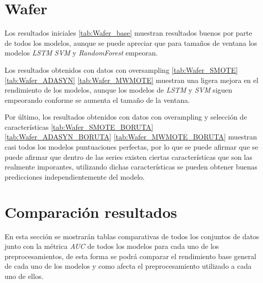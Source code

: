 \section{Wafer}

Los resultados iniciales \ref{tab:Wafer_base} muestran resultados buenos por parte de todos los modelos, aunque se puede apreciar que para tamaños de ventana los modelos \textit{LSTM} \textit{SVM} y \textit{RandomForest} empeoran.\newline

Los resultados obtenidos con datos con oversampling \ref{tab:Wafer_SMOTE} \ref{tab:Wafer_ADASYN} \ref{tab:Wafer_MWMOTE} muestran una ligera mejora en el rendimiento de los modelos, aunque los modelos de \textit{LSTM} y \textit{SVM} siguen empeorando conforme se aumenta el tamaño de la ventana.\newline

Por último, los resultados obtenidos con datos con overampling y selección de características \ref{tab:Wafer_SMOTE_BORUTA} \ref{tab:Wafer_ADASYN_BORUTA} \ref{tab:Wafer_MWMOTE_BORUTA} muestran casi todos los modelos puntuaciones perfectas, por lo que se puede afirmar que se puede afirmar que dentro de las series existen ciertas características que son las realmente imporantes, utilizando dichas características se pueden obtener buenas predicciones independientemente del modelo.\newline

\section{Comparación resultados}
En esta sección se mostrarán tablas comparativas de todos los conjuntos de datos junto con la métrica \textit{AUC} de todos los modelos para cada uno de los preprocesamientos, de esta forma se podrá comparar el rendimiento base general de cada uno de los modelos y como afecta el preprocesamiento utilizado a cada uno de ellos.\newline

\newpage

